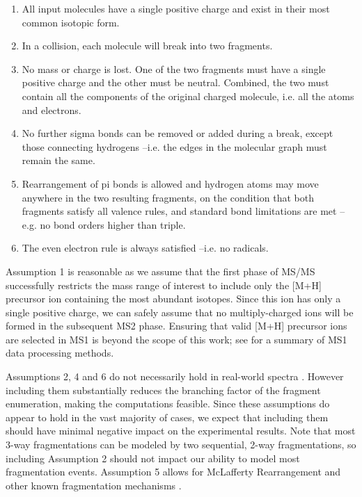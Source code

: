 \begin{enumerate}
\item All input molecules have a single positive charge and exist in their most common isotopic form. 
\item In a collision, each molecule will break into two fragments.
\item No mass or charge is lost. One of the two fragments must have a single positive charge and the other must be neutral. Combined, the two must contain all the components of the original charged molecule, i.e. all the atoms and electrons.
\item No further sigma bonds can be removed or added during a break, except those connecting hydrogens --i.e. the edges in the molecular graph must remain the same.
\item Rearrangement of pi bonds is allowed and hydrogen atoms may move anywhere in the two resulting fragments, on the condition that both fragments satisfy all valence rules, and standard bond limitations are met --e.g. no bond orders higher than triple.
\item The even electron rule is always satisfied --i.e. no radicals.
\end{enumerate}

Assumption 1 is reasonable as we assume that the first phase of MS/MS successfully restricts the mass range of interest to include only the [M+H] precursor ion containing the most abundant isotopes. Since this ion has only a single positive charge, we can safely assume that no multiply-charged ions will be formed in the subsequent MS2 phase. Ensuring that valid [M+H] precursor ions are selected in MS1 is beyond the scope of this work; see \citet{Katajamaa2007} for a summary of MS1 data processing methods.

Assumptions 2, 4 and 6 do not necessarily hold in real-world spectra \citep{Galezowska2013, Levsen2007}. However including them substantially reduces the branching factor of the fragment enumeration, making the computations feasible. Since these assumptions do appear to hold in the vast majority of cases, we expect that including them should have minimal negative impact on the experimental results. 
Note that most 3-way fragmentations can be modeled by two sequential, 2-way fragmentations, so including Assumption 2 should not impact our ability to model most fragmentation events.
Assumption 5 allows for McLafferty Rearrangement and other known fragmentation mechanisms \citep{McLafferty1993}. 


